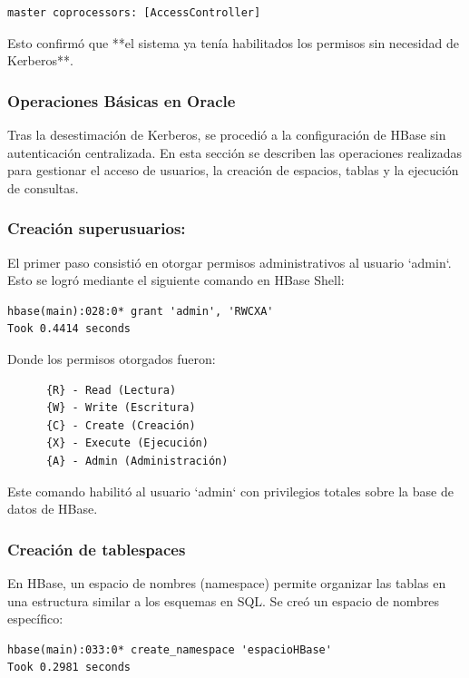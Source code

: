 \documentclass{article}
\begin{document}
\begin{verbatim}
master coprocessors: [AccessController]
\end{verbatim}

Esto confirmó que **el sistema ya tenía habilitados los permisos sin necesidad de Kerberos**.

\subsubsection{Operaciones Básicas en Oracle}

Tras la desestimación de Kerberos, se procedió a la configuración de HBase sin autenticación centralizada. En esta sección se describen las operaciones realizadas para gestionar el acceso de usuarios, la creación de espacios, tablas y la ejecución de consultas.

\subsubsection{Creación superusuarios:}
El primer paso consistió en otorgar permisos administrativos al usuario `admin`. Esto se logró mediante el siguiente comando en HBase Shell:

\begin{lstlisting}[style=bashStyle]
hbase(main):028:0* grant 'admin', 'RWCXA'
Took 0.4414 seconds
\end{lstlisting}

Donde los permisos otorgados fueron:
\begin{verbatim}
      {R} - Read (Lectura)
      {W} - Write (Escritura)
      {C} - Create (Creación)
      {X} - Execute (Ejecución)
      {A} - Admin (Administración)
\end{verbatim}

Este comando habilitó al usuario `admin` con privilegios totales sobre la base de datos de HBase.

\subsubsection{Creación de tablespaces}

En HBase, un espacio de nombres (namespace) permite organizar las tablas en una estructura similar a los esquemas en SQL. Se creó un espacio de nombres específico:

\begin{lstlisting}[style=bashStyle]
hbase(main):033:0* create_namespace 'espacioHBase'
Took 0.2981 seconds
\end{lstlisting}
\end{document}
